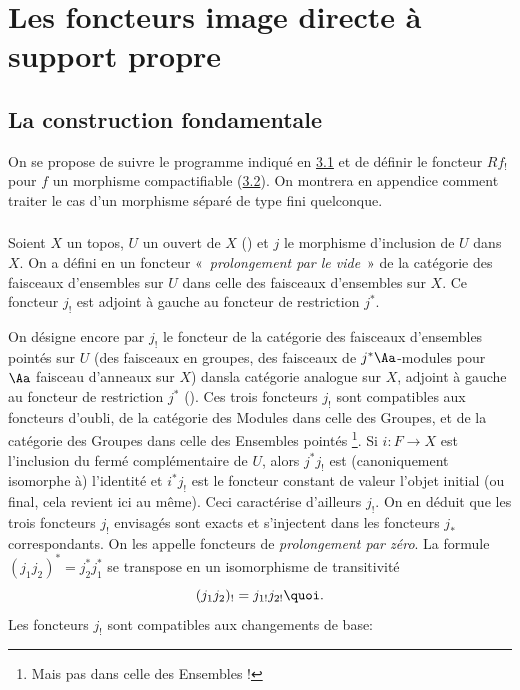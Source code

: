 \documentclass[10pt]{../fichiers-configuration-latex/smfart}
\begin{document}
\section{Les foncteurs image directe à support propre}

\subsection{La construction fondamentale}

On se propose de suivre le programme indiqué en \hyperref[XVII.subsec3.1]{3.1}
et de définir le
foncteur $Rf_{!}$ pour $f$ un morphisme compactifiable
(\hyperref[XVII.subsec3.2]{3.2}). On
montrera en appendice comment traiter le cas d'un morphisme séparé de
type fini quelconque.

\subsubsection{}

Soient $X$ un topos, $U$ un ouvert de $X$ () et $j$ le morphisme
d'inclusion de $U$ dans $X$. On a défini en  un foncteur « \emph{prolongement par le vide} »  de la catégorie des faisceaux
d'ensembles sur $U$ dans celle des faisceaux d'ensembles sur $X$. Ce
foncteur $j_{!}$ est adjoint à gauche au foncteur de restriction
$j^{\ast}$.

On désigne encore par $j_{!}$ le foncteur de la catégorie des
faisceaux d'ensembles pointés sur $U$ (\resp des faisceaux en groupes,
\resp des faisceaux de $j^{\ast}\Aa$-modules pour
$\Aa$ faisceau d'anneaux sur $X$) dans\pageoriginale la
catégorie analogue sur $X$, adjoint à gauche au foncteur de
restriction $j^{\ast}$ (). Ces trois foncteurs $j_{!}$ sont
compatibles aux foncteurs d'oubli, de la catégorie des Modules dans
celle des Groupes, et de la catégorie des Groupes dans celle des
Ensembles pointés \footnote[1]{Mais pas dans celle des Ensembles
!}. Si $i:F\rightarrow X$ est l'inclusion du fermé complémentaire de
$U$, alors $j^{\ast}j_{!}$ est (canoniquement isomorphe à) l'identité
et $i^{\ast}j_{!}$ est le foncteur constant de valeur l'objet initial
(ou final, cela revient ici au même). Ceci caractérise d'ailleurs
$j_{!}$. On en déduit que les trois foncteurs $j_{!}$ envisagés sont
exacts et s'injectent dans les foncteurs $j_{\ast}$ correspondants. On
les appelle foncteurs de \emph{prolongement par zéro}. La formule
$(j_1j_2)^{\ast}=j^{\ast}_2 j^{\ast}_1$ se transpose en un
isomorphisme de transitivité
\[
(j_1 j_2)_{!}=j_{1!}j_{2!}{\quoi}.
\]
Les foncteurs $j_{!}$ sont compatibles aux changements de base:
\end{document}
